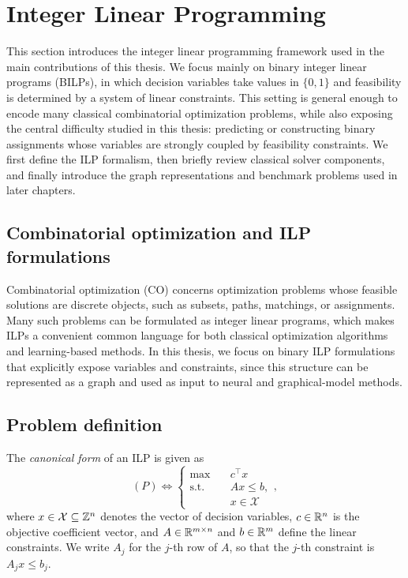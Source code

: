 \section{Integer Linear Programming}
\label{sec:co_intro}
\label{chap:chapter_1.1_integer_linear_programming}

This section introduces the integer linear programming framework used in the main contributions of this thesis. We focus mainly on binary integer linear programs (BILPs), in which decision variables take values in $\{0,1\}$ and feasibility is determined by a system of linear constraints. This setting is general enough to encode many classical combinatorial optimization problems, while also exposing the central difficulty studied in this thesis: predicting or constructing binary assignments whose variables are strongly coupled by feasibility constraints. We first define the ILP formalism, then briefly review classical solver components, and finally introduce the graph representations and benchmark problems used in later chapters.

\subsection{Combinatorial optimization and ILP formulations}

Combinatorial optimization (CO) concerns optimization problems whose feasible solutions are discrete objects, such as subsets, paths, matchings, or assignments. Many such problems can be formulated as integer linear programs, which makes ILPs a convenient common language for both classical optimization algorithms and learning-based methods. In this thesis, we focus on binary ILP formulations that explicitly expose variables and constraints, since this structure can be represented as a graph and used as input to neural and graphical-model methods.

\subsection{Problem definition}
The \emph{canonical form} of an ILP is given as
\begin{equation}
    \label{equ:ilp_canonical_form}
    (P) \Leftrightarrow \left\{
    \begin{aligned}
        \max \quad & c^\top x \\
        \text{s.t.} \quad & Ax \leq b, \\
        & x \in \mathcal{X}
    \end{aligned} \right. ,
\end{equation}
where $x\in \mathcal{X} \subseteq \mathbb{Z}^n$ denotes the vector of decision variables, $c\in\mathbb{R}^n$ is the objective coefficient vector, and $A\in\mathbb{R}^{m\times n}$ and $b\in\mathbb{R}^m$ define the linear constraints. We write $A_j$ for the $j$-th row of $A$, so that the $j$-th constraint is $A_jx \leq b_j$. 

